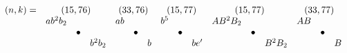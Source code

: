 \documentclass{article}
\begin{document}
\(
\begin{array}{crclrclrclrclrclrclrclrcl}
  (n,k)= & \multicolumn{3}{c}{(15,76)} & \multicolumn{3}{c}{(33,76)} & \multicolumn{3}{c}{(15,77)} & \multicolumn{3}{c}{(15,77)} & \multicolumn{3}{c}{(33,77)}  \\
  & ab^2b_2 & & & ab & & & b^5 & & & AB^2B_2 &&& AB \\
  & & \bullet & & & \bullet & & & \bullet & & & \bullet & & & \bullet \\
  & & & b^2b_2 & & & b & & & be' &&& B^2B_2 &&& B
\end{array}
\)\\
\end{document}
